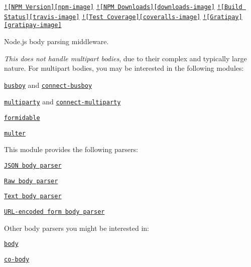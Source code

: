 \href{https://npmjs.org/package/body-parser}{\tt !\mbox{[}N\+P\+M Version\mbox{]}\mbox{[}npm-\/image\mbox{]}} \href{https://npmjs.org/package/body-parser}{\tt !\mbox{[}N\+P\+M Downloads\mbox{]}\mbox{[}downloads-\/image\mbox{]}} \href{https://travis-ci.org/expressjs/body-parser}{\tt !\mbox{[}Build Status\mbox{]}\mbox{[}travis-\/image\mbox{]}} \href{https://coveralls.io/r/expressjs/body-parser?branch=master}{\tt !\mbox{[}Test Coverage\mbox{]}\mbox{[}coveralls-\/image\mbox{]}} \href{https://www.gratipay.com/dougwilson/}{\tt !\mbox{[}Gratipay\mbox{]}\mbox{[}gratipay-\/image\mbox{]}}

Node.\+js body parsing middleware.

{\itshape This does not handle multipart bodies}, due to their complex and typically large nature. For multipart bodies, you may be interested in the following modules\+:


\begin{DoxyItemize}
\item \href{https://www.npmjs.org/package/busboy#readme}{\tt busboy} and \href{https://www.npmjs.org/package/connect-busboy#readme}{\tt connect-\/busboy}
\item \href{https://www.npmjs.org/package/multiparty#readme}{\tt multiparty} and \href{https://www.npmjs.org/package/connect-multiparty#readme}{\tt connect-\/multiparty}
\item \href{https://www.npmjs.org/package/formidable#readme}{\tt formidable}
\item \href{https://www.npmjs.org/package/multer#readme}{\tt multer}
\end{DoxyItemize}

This module provides the following parsers\+:


\begin{DoxyItemize}
\item \href{#bodyparserjsonoptions}{\tt J\+S\+O\+N body parser}
\item \href{#bodyparserrawoptions}{\tt Raw body parser}
\item \href{#bodyparsertextoptions}{\tt Text body parser}
\item \href{#bodyparserurlencodedoptions}{\tt U\+R\+L-\/encoded form body parser}
\end{DoxyItemize}

Other body parsers you might be interested in\+:


\begin{DoxyItemize}
\item \href{https://www.npmjs.org/package/body#readme}{\tt body}
\item \href{https://www.npmjs.org/package/co-body#readme}{\tt co-\/body}
\end{DoxyItemize}

